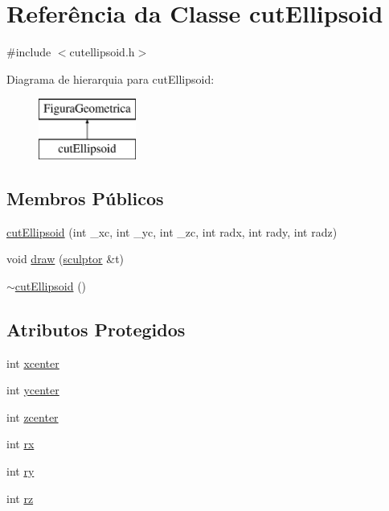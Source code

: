 \hypertarget{classcut_ellipsoid}{}\section{Referência da Classe cut\+Ellipsoid}
\label{classcut_ellipsoid}


{\ttfamily \#include $<$cutellipsoid.\+h$>$}

Diagrama de hierarquia para cut\+Ellipsoid\+:\begin{figure}[H]
\begin{center}
\leavevmode
\includegraphics[height=2.000000cm]{classcut_ellipsoid}
\end{center}
\end{figure}
\subsection*{Membros Públicos}
\begin{DoxyCompactItemize}
\item 
\mbox{\hyperlink{classcut_ellipsoid_a9b92871ea191fb99e7fe5ff8b8964d50}{cut\+Ellipsoid}} (int \+\_\+xc, int \+\_\+yc, int \+\_\+zc, int radx, int rady, int radz)
\item 
void \mbox{\hyperlink{classcut_ellipsoid_aa0059cc77c6bb3d4c6c5dd9081ba07c1}{draw}} (\mbox{\hyperlink{classsculptor}{sculptor}} \&t)
\item 
\mbox{\hyperlink{classcut_ellipsoid_ae4877ae289158979d34ac8c19caeb7fe}{$\sim$cut\+Ellipsoid}} ()
\end{DoxyCompactItemize}
\subsection*{Atributos Protegidos}
\begin{DoxyCompactItemize}
\item 
int \mbox{\hyperlink{classcut_ellipsoid_a304154fe1dc0fbea4c49ee966c68ab48}{xcenter}}
\item 
int \mbox{\hyperlink{classcut_ellipsoid_aa2a2eefd5a5720f012755e54b08315db}{ycenter}}
\item 
int \mbox{\hyperlink{classcut_ellipsoid_abd11fe46fed39a748129765595798dc5}{zcenter}}
\item 
int \mbox{\hyperlink{classcut_ellipsoid_a5bc67b7361ed9834ea2f97764d36e4f4}{rx}}
\item 
int \mbox{\hyperlink{classcut_ellipsoid_a4997def81944105a70d4e4081bbecdfc}{ry}}
\item 
int \mbox{\hyperlink{classcut_ellipsoid_a5a9348761f4de1adb4b8c310b8f5175e}{rz}}
\end{DoxyCompactItemize}


